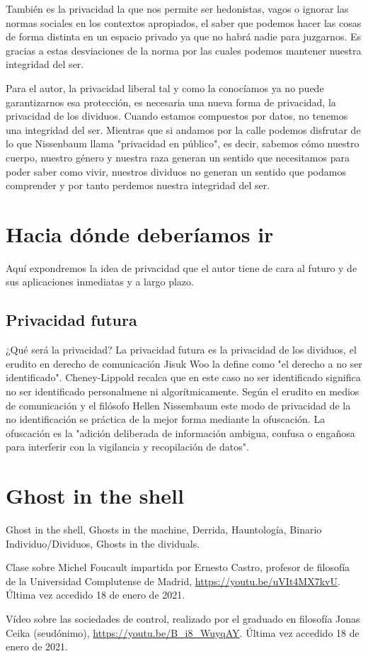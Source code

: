 \documentclass[11pt]{article}
\begin{document}
También es la privacidad la que nos permite ser hedonistas, vagos o ignorar las normas sociales en los contextos apropiados, el saber que podemos hacer las cosas de forma distinta en un espacio privado ya que no habrá nadie para juzgarnos. Es gracias a estas desviaciones de la norma por las cuales podemos mantener nuestra integridad del ser.

Para el autor, la privacidad liberal tal y como la conocíamos ya no puede garantizarnos esa protección, es necesaria una nueva forma de privacidad, la privacidad de los dividuos. Cuando estamos compuestos por datos, no tenemos una integridad del ser. Mientras que si andamos por la calle podemos disfrutar de lo que Nissenbaum llama "privacidad en público", es decir, sabemos cómo nuestro cuerpo, nuestro género y nuestra raza generan un sentido que necesitamos para poder saber como vivir, nuestros dividuos no generan un sentido que podamos comprender y por tanto perdemos nuestra integridad del ser.
\section{Hacia dónde deberíamos ir}
Aquí expondremos la idea de privacidad que el autor tiene de cara al futuro y de sus aplicaciones inmediatas y a largo plazo.
\subsection{Privacidad futura}
¿Qué será la privacidad? La privacidad futura es la privacidad de los dividuos, el erudito en derecho de comunicación Jisuk Woo la define como "el derecho a no ser identificado". Cheney-Lippold recalca que en este caso no ser identificado significa no ser identificado personalmene ni algorítmicamente. Según el erudito en medios de comunicación y el filósofo Hellen Nissembaum este modo de privacidad de la no identificación se práctica de la mejor forma mediante la ofuscación. La ofuscación es la "adición deliberada de información ambigua, confusa o engañosa para interferir con la vigilancia y recopilación de datos".
\section{Ghost in the shell}
Ghost in the shell, Ghosts in the machine, Derrida, Hauntología, Binario Individuo/Dividuos, Ghosts in the dividuals.
\begin{thebibliography}{8}
        Clase sobre Michel Foucault impartida por Ernesto Castro, profesor de filosofía de la Universidad Complutense de Madrid, \url{https://youtu.be/uVIt4MX7kvU}. Última vez accedido 18 de enero de 2021.

        Vídeo sobre las sociedades de control, realizado por el graduado en filosofía Jonas Ceika (seudónimo), \url{https://youtu.be/B_i8_WuyqAY}. Última vez accedido 18 de enero de 2021.
\end{thebibliography}
\end{document}
